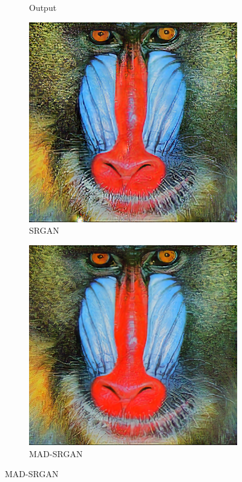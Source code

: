\documentclass[12pt,a4paper]{article}
\begin{document}
\begin{figure}[H]
\begin{subfigure}{0.2\textwidth}
                \caption*{Output}
            \end{subfigure}
            \enspace
            \begin{subfigure}{0.2\textwidth}
                \includegraphics[width=\textwidth]{images/samples/img-1-srgan.png}
                \caption*{SRGAN}
            \end{subfigure}
            \enspace
            \begin{subfigure}{0.2\textwidth}
                \includegraphics[width=\textwidth]{images/samples/img-1-mad-srgan.png}
                \caption*{MAD-SRGAN}
            \end{subfigure}
        \end{figure}
\end{document}
